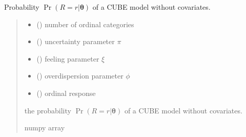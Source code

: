 \documentclass[letterpaper,10pt,english]{sphinxmanual}
\begin{document}
\begin{fulllineitems}
\label{\detokenize{cubmods:cubmods.cube.prob}}
\pysigstartsignatures
{}
\pysigstopsignatures
\sphinxAtStartPar
Probability \(\Pr(R = r | \pmb\theta)\) of a CUBE model without covariates.
\begin{quote}\begin{description}
\begin{itemize}
\item {} 
\sphinxAtStartPar
{} () \textendash{} number of ordinal categories

\item {} 
\sphinxAtStartPar
{} () \textendash{} uncertainty parameter \(\pi\)

\item {} 
\sphinxAtStartPar
{} () \textendash{} feeling parameter \(\xi\)

\item {} 
\sphinxAtStartPar
{} () \textendash{} overdispersion parameter \(\phi\)

\item {} 
\sphinxAtStartPar
{} () \textendash{} ordinal response

\end{itemize}

\sphinxAtStartPar
the probability \(\Pr(R = r | \pmb\theta)\) of a CUBE model without covariates.

\sphinxAtStartPar
numpy array

\end{description}\end{quote}

\end{fulllineitems}
\end{document}
